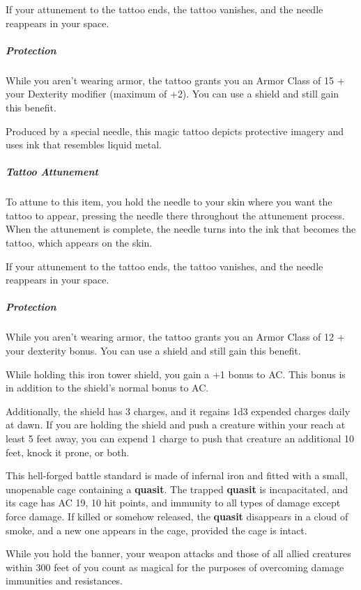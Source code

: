 \documentclass[10pt,a4paper,twoside,bg=print,twocolumn,openany,nodeprecatedcode]{dndbook}
\begin{document}
If your attunement to the tattoo ends, the tattoo vanishes, and the needle reappears in your space.

\subparagraph{Protection}
While you aren't wearing armor, the tattoo grants you an Armor Class of 15 + your Dexterity modifier (maximum of +2). You can use a shield and still gain this benefit.

Produced by a special needle, this magic tattoo depicts protective imagery and uses ink that resembles liquid metal.

\subparagraph{Tattoo Attunement}
To attune to this item, you hold the needle to your skin where you want the tattoo to appear, pressing the needle there throughout the attunement process. When the attunement is complete, the needle turns into the ink that becomes the tattoo, which appears on the skin.

If your attunement to the tattoo ends, the tattoo vanishes, and the needle reappears in your space.

\subparagraph{Protection}
While you aren't wearing armor, the tattoo grants you an Armor Class of 12 + your dexterity bonus. You can use a shield and still gain this benefit.

While holding this iron tower shield, you gain a +1 bonus to AC. This bonus is in addition to the shield's normal bonus to AC.

Additionally, the shield has 3 charges, and it regains 1d3 expended charges daily at dawn. If you are holding the shield and push a creature within your reach at least 5 feet away, you can expend 1 charge to push that creature an additional 10 feet, knock it prone, or both.

This hell-forged battle standard is made of infernal iron and fitted with a small, unopenable cage containing a \textbf{quasit}. The trapped \textbf{quasit} is incapacitated, and its cage has AC 19, 10 hit points, and immunity to all types of damage except force damage. If killed or somehow released, the \textbf{quasit} disappears in a cloud of smoke, and a new one appears in the cage, provided the cage is intact.

While you hold the banner, your weapon attacks and those of all allied creatures within 300 feet of you count as magical for the purposes of overcoming damage immunities and resistances.
\end{document}
